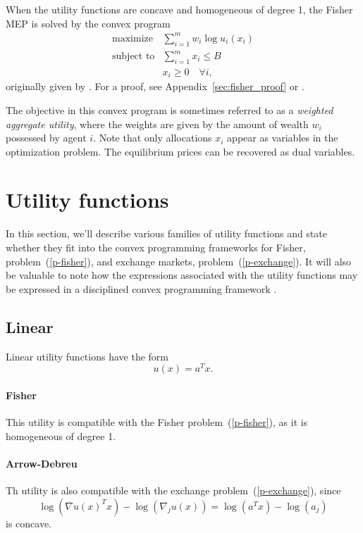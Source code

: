 \documentclass[12pt]{article}
\begin{document}
When the utility functions are concave and homogeneous of degree 1,
the Fisher MEP is solved by the convex program
\begin{equation}
\label{p-fisher}
\begin{array}{ll}
\mbox{maximize} & \sum_{i=1}^m w_i \log u_i(x_i) \\
\mbox{subject to} & \sum_{i=1}^m x_i \leq B\\
& x_i \geq 0\quad \forall i,
\end{array}
\end{equation}
originally given by \cite{eisenberg1959consensus, gale1960theory, eisenberg1961aggregation}.
For a proof, see Appendix~\ref{sec:fisher_proof} or \cite[\S~6.2]{nisan2007algorithmic}.

The objective in this convex program is sometimes referred to as a \emph{weighted aggregate utility}, where the weights are given by the amount
of wealth $w_i$ possessed by agent $i$.
Note that only allocations $x_i$ appear as variables in the optimization
problem.
The equilibrium prices can be recovered as dual variables.

\section{Utility functions}
\label{sec:util_funcs}

In this section, we'll describe various families of utility functions
and state whether they fit into the convex programming frameworks
for Fisher, problem~(\ref{p-fisher}), and exchange markets, problem~(\ref{p-exchange}). 
It will also
be valuable to note how the expressions associated
with the utility functions may be expressed in a disciplined
convex programming framework \cite{grant2006disciplined}.

\subsection{Linear}
Linear utility functions have the form
\[
u(x) = a^T x.
\]

\paragraph{Fisher}
This utility is compatible with the Fisher problem~(\ref{p-fisher}), as it is homogeneous of degree 1.

\paragraph{Arrow-Debreu}
Th utility is also compatible with the exchange problem~(\ref{p-exchange}),
since
\[
\log(\nabla u(x)^T x) - \log(\nabla_j u(x))  = \log(a^T x) - \log(a_j)
\]
is concave.
\end{document}
